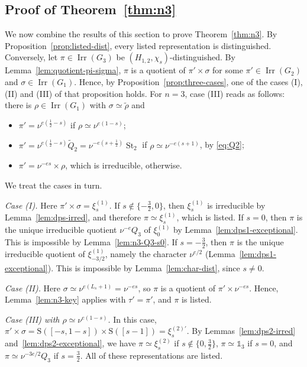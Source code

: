 \documentclass[11pt]{amsart}
\numberwithin{equation}{section}
\theoremstyle{plain}
\theoremstyle{definition}
\theoremstyle{remark}
\newcommand{\one}{\mathds{1}}
\DeclareMathOperator{\Irr}{Irr}
\DeclareMathOperator{\St}{St}
\newcommand{\Qt}{\widetilde{Q}}
\newcommand{\xione}{\xi^{(1)}}
\newcommand{\xitwo}{\xi^{(2)}}
\newcommand{\Ss}{\mathrm{S}}
\begin{document}
\subsection{Proof of Theorem~\ref{thm:n3}}\label{ss:n3-proof}

We now combine the results of this section to prove Theorem~\ref{thm:n3}. By Proposition~\ref{prop:listed-dist}, every listed representation is distinguished. Conversely, let $\pi\in\Irr(G_3)$ be $(H_{1,2},\chi_s)$-distinguished. By Lemma~\ref{lem:quotient-pi-sigma}, $\pi$ is a quotient of $\pi'\times\sigma$ for some $\pi'\in\Irr(G_2)$ and $\sigma\in\Irr(G_1)$. Hence, by Proposition~\ref{prop:three-cases}, one of the cases (I), (II) and (III) of that proposition holds. For $n=3$, case (III) reads as follows: there is $\rho\in\Irr(G_1)$ with $\sigma\simeq\widetilde\rho$ and
\begin{itemize}
	\item $\pi'=\nu^{e(\frac12-s)}$ if $\rho\simeq\nu^{e(1-s)}$;
	\item $\pi'=\nu^{e(\frac12-s)}\Qt_2=\nu^{-e(s+\frac12)}\St_2$ if $\rho\simeq\nu^{-e(s+1)}$, by \eqref{eq:Q2};
	\item $\pi'=\nu^{-es}\times\rho$, which is irreducible, otherwise.
\end{itemize}
We treat the cases in turn.

\emph{Case \textup{(I)}.} Here $\pi'\times\sigma=\xione_s$. If $s\notin\{-\frac32,0\}$, then $\xione_s$ is irreducible by Lemma~\ref{lem:dps-irred}, and therefore $\pi\simeq\xione_s$, which is listed. If $s=0$, then $\pi$ is the unique irreducible quotient $\nu^{-e}Q_3$ of $\xione_0$ by Lemma~\ref{lem:dps1-exceptional}. This is impossible by Lemma~\ref{lem:n3-Q3-s0}. If $s=-\frac32$, then $\pi$ is the unique irreducible quotient of $\xione_{-3/2}$, namely the character $\nu^{e/2}$ (Lemma~\ref{lem:dps1-exceptional}). This is impossible by Lemma~\ref{lem:char-dist}, since $s\ne0$.

\emph{Case \textup{(II)}.} Here $\sigma\simeq\nu^{e(L_s+1)}=\nu^{-es}$, so $\pi$ is a quotient of $\pi'\times\nu^{-es}$. Hence, Lemma~\ref{lem:n3-key} applies with $\tau'=\pi'$, and $\pi$ is listed.

\emph{Case \textup{(III)} with $\rho\simeq\nu^{e(1-s)}$.} In this case, $\pi'\times\sigma=\Ss([-s,1-s])\times\Ss([s-1])=\xi^{(2)\prime}_s$. By Lemmas~\ref{lem:dps2-irred} and~\ref{lem:dps2-exceptional}, we have $\pi\simeq\xitwo_s$ if $s\notin\{0,\frac32\}$, $\pi\simeq\one_3$ if $s=0$, and $\pi\simeq\nu^{-3e/2}Q_3$ if $s=\frac32$. All of these representations are listed.
\end{document}
